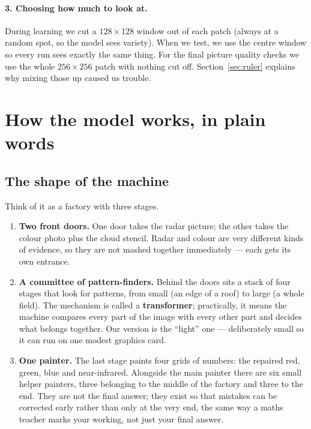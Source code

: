 \documentclass[11pt,a4paper]{article}
\newcommand{\term}[1]{\textbf{#1}}
\begin{document}
\paragraph{3. Choosing how much to look at.}
During learning we cut a $128 \times 128$ window out of each patch (always at a random spot, so the
model sees variety). When we test, we use the centre window so every run sees exactly the same
thing. For the final picture quality checks we use the whole $256 \times 256$ patch with nothing cut
off. Section~\ref{sec:ruler} explains why mixing those up caused us trouble.

\section{How the model works, in plain words}

\subsection{The shape of the machine}

Think of it as a factory with three stages.

\begin{enumerate}
\item \textbf{Two front doors.} One door takes the radar picture; the other takes the colour photo
      plus the cloud stencil. Radar and colour are very different kinds of evidence, so they are not
      mashed together immediately --- each gets its own entrance.
\item \textbf{A committee of pattern-finders.} Behind the doors sits a stack of four stages that
      look for patterns, from small (an edge of a roof) to large (a whole field). The mechanism is
      called a \term{transformer}; practically, it means the machine compares every part of the
      image with every other part and decides what belongs together. Our version is the
      ``light'' one --- deliberately small so it can run on one modest graphics card.
\item \textbf{One painter.} The last stage paints four grids of numbers: the repaired red, green,
      blue and near-infrared. Alongside the main painter there are six small helper painters, three
      belonging to the middle of the factory and three to the end. They are not the final answer;
      they exist so that mistakes can be corrected early rather than only at the very end, the same
      way a maths teacher marks your working, not just your final answer.
\end{enumerate}
\end{document}
